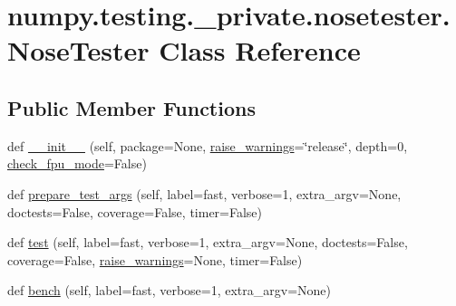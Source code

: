 \hypertarget{classnumpy_1_1testing_1_1__private_1_1nosetester_1_1NoseTester}{}\section{numpy.\+testing.\+\_\+private.\+nosetester.\+Nose\+Tester Class Reference}
\label{classnumpy_1_1testing_1_1__private_1_1nosetester_1_1NoseTester}
\subsection*{Public Member Functions}
\begin{DoxyCompactItemize}
\item 
def \hyperlink{classnumpy_1_1testing_1_1__private_1_1nosetester_1_1NoseTester_a0a725bec7d582c2cb49ff3b73fbeeb81}{\+\_\+\+\_\+init\+\_\+\+\_\+} (self, package=None, \hyperlink{classnumpy_1_1testing_1_1__private_1_1nosetester_1_1NoseTester_a6ea4848c8dc9cde3964f7e58298831a8}{raise\+\_\+warnings}=\char`\"{}release\char`\"{}, depth=0, \hyperlink{classnumpy_1_1testing_1_1__private_1_1nosetester_1_1NoseTester_a2244951b799d844c57b9a0b19a1bbdb1}{check\+\_\+fpu\+\_\+mode}=False)
\item 
def \hyperlink{classnumpy_1_1testing_1_1__private_1_1nosetester_1_1NoseTester_a67f7e5d6b71983e95608039238e28f8d}{prepare\+\_\+test\+\_\+args} (self, label=\textquotesingle{}fast\textquotesingle{}, verbose=1, extra\+\_\+argv=None, doctests=False, coverage=False, timer=False)
\item 
def \hyperlink{classnumpy_1_1testing_1_1__private_1_1nosetester_1_1NoseTester_a4bb93c29fd82f62ea6928836904d95ce}{test} (self, label=\textquotesingle{}fast\textquotesingle{}, verbose=1, extra\+\_\+argv=None, doctests=False, coverage=False, \hyperlink{classnumpy_1_1testing_1_1__private_1_1nosetester_1_1NoseTester_a6ea4848c8dc9cde3964f7e58298831a8}{raise\+\_\+warnings}=None, timer=False)
\item 
def \hyperlink{classnumpy_1_1testing_1_1__private_1_1nosetester_1_1NoseTester_a4638989956635c6a695559927b1b7491}{bench} (self, label=\textquotesingle{}fast\textquotesingle{}, verbose=1, extra\+\_\+argv=None)
\end{DoxyCompactItemize}
